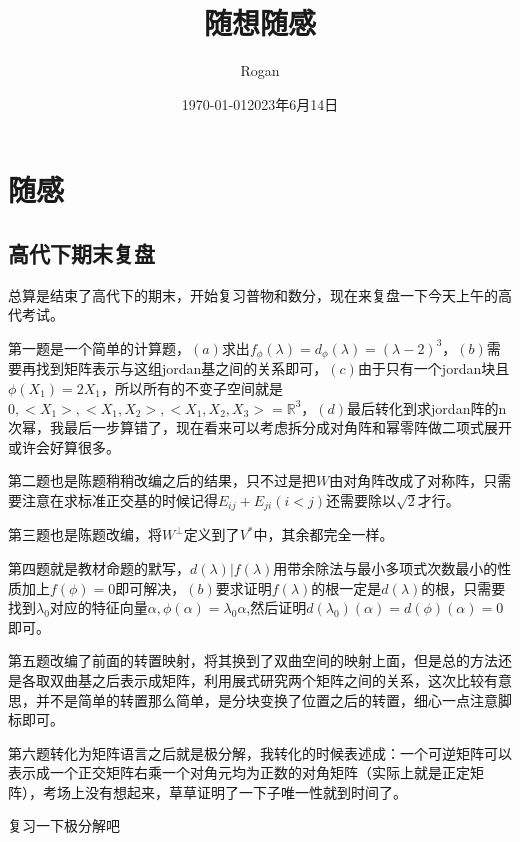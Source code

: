 \documentclass[12pt, a4paper, oneside]{ctexart}
\title{随想随感}
\author{Rogan}
\date{\today}
\begin{document}
\maketitle

\tableofcontents

\section{随感}

\subsection{高代下期末复盘}

\date{2023年6月14日}

总算是结束了高代下的期末，开始复习普物和数分，现在来复盘一下今天上午的高代考试。

第一题是一个简单的计算题，$(a)$求出$f_{\phi}(\lambda)=d_{\phi}(\lambda)=(\lambda-2)^3$，$(b)$需要再找到矩阵表示与这组jordan基之间的关系即可，$(c)$由于只有一个jordan块且$\phi(X_1)=2X_1$，所以所有的不变子空间就是$0,<X_1>,<X_1,X_2>,<X_1,X_2,X_3>=\mathbb{R} ^3$，$(d)$最后转化到求jordan阵的n次幂，我最后一步算错了，现在看来可以考虑拆分成对角阵和幂零阵做二项式展开或许会好算很多。

第二题也是陈题稍稍改编之后的结果，只不过是把$W$由对角阵改成了对称阵，只需要注意在求标准正交基的时候记得$E_{ij}+E_{ji}(i<j)$还需要除以$\sqrt{2}$才行。

第三题也是陈题改编，将$W^{\bot }$定义到了$V^*$中，其余都完全一样。

第四题就是教材命题的默写，$d(\lambda)|f(\lambda)$用带余除法与最小多项式次数最小的性质加上$f(\phi)=0$即可解决，$(b)$要求证明$f(\lambda)$的根一定是$d(\lambda)$的根，只需要找到$\lambda_0$对应的特征向量$\alpha,\phi(\alpha)=\lambda_0\alpha$,然后证明$d(\lambda_0)(\alpha)=d(\phi)(\alpha)=0$即可。

第五题改编了前面的转置映射，将其换到了双曲空间的映射上面，但是总的方法还是各取双曲基之后表示成矩阵，利用展式研究两个矩阵之间的关系，这次比较有意思，并不是简单的转置那么简单，是分块变换了位置之后的转置，细心一点注意脚标即可。

第六题转化为矩阵语言之后就是极分解，我转化的时候表述成：一个可逆矩阵可以表示成一个正交矩阵右乘一个对角元均为正数的对角矩阵（实际上就是正定矩阵），考场上没有想起来，草草证明了一下子唯一性就到时间了。

复习一下极分解吧
\end{document}

